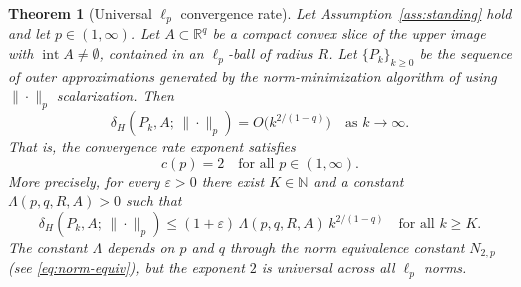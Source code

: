 \documentclass[11pt]{article}
\newtheorem{theorem}{Theorem}
\newcommand{\R}{\mathbb{R}}
\begin{document}
\begin{theorem}[Universal $\ell_p$ convergence rate]\label{thm:lp-rate}
Let Assumption~\ref{ass:standing} hold and let $p \in (1,\infty)$. Let $A \subset \R^q$ be a compact convex slice of the upper image with $\operatorname{int} A \neq \emptyset$, contained in an $\ell_p$-ball of radius $R$. Let $\{P_k\}_{k \ge 0}$ be the sequence of outer approximations generated by the norm-minimization algorithm of \cite{Ararat2022} using $\|\cdot\|_p$ scalarization. Then
\begin{equation}\label{eq:main-rate}
\delta_H(P_k, A;\, \|\cdot\|_p) = O\bigl(k^{2/(1-q)}\bigr) \quad \text{as } k \to \infty.
\end{equation}
That is, the convergence rate exponent satisfies
\begin{equation}\label{eq:c-of-p}
c(p) = 2 \quad \text{for all } p \in (1, \infty).
\end{equation}
More precisely, for every $\varepsilon > 0$ there exist $K \in \mathbb{N}$ and a constant $\Lambda(p, q, R, A) > 0$ such that
\[
\delta_H(P_k, A;\, \|\cdot\|_p) \le (1+\varepsilon)\, \Lambda(p,q,R,A)\, k^{2/(1-q)} \quad \text{for all } k \ge K.
\]
The constant $\Lambda$ depends on $p$ and $q$ through the norm equivalence constant $N_{2,p}$ (see \eqref{eq:norm-equiv}), but the exponent $2$ is universal across all $\ell_p$ norms.
\end{theorem}
\end{document}
